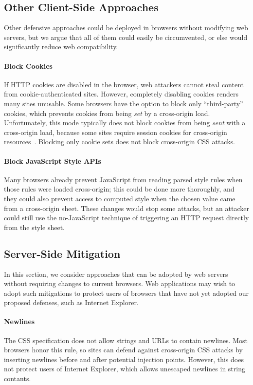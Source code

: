 \documentclass{acm_proc_article-sp}
\begin{document}
\subsection{Other Client-Side Approaches}
Other defensive approaches could be deployed in browsers without
modifying web servers, but we argue that all of them could easily be
circumvented, or else would significantly reduce web compatibility.

\paragraph{Block Cookies}
If HTTP cookies are disabled in the browser, web attackers cannot
steal content from cookie-au\-then\-ti\-cated sites.  However, completely
disabling cookies renders many sites unusable.  Some browsers have the
option to block only “third-party” cookies, which prevents cookies
from being \emph{set} by a cross-origin load.  Unfortunately, this
mode typically does not block cookies from being \emph{sent} with a
cross-origin load, because some sites require session cookies for
cross-origin resources~\cite{jackson06thirdpartycookies}.  Blocking
only cookie sets does not block cross-origin CSS attacks.

\paragraph{Block JavaScript Style APIs}
Many browsers already prevent JavaScript from reading parsed style
rules when those rules were loaded cross-origin; this could be done
more thoroughly, and they could also prevent access to computed style
when the chosen value came from a cross-origin sheet.  These changes
would stop some attacks, but an attacker could still use the
no-JavaScript technique of triggering an HTTP request directly from
the style sheet.

\subsection{Server-Side Mitigation}
In this section, we consider approaches that can be adopted
by web servers without requiring changes to current browsers.
Web applications may wish to adopt such mitigations to
protect users of browsers that have not yet adopted our
proposed defenses, such as Internet Explorer.

\paragraph{Newlines}
The CSS specification does not allow strings and URLs to contain
newlines.  Most browsers honor this rule, so sites can defend against
cross-origin CSS attacks by inserting newlines before and after
potential injection points.  However, this does not protect users of
Internet Explorer, which allows unescaped newlines in string contants.
\end{document}
